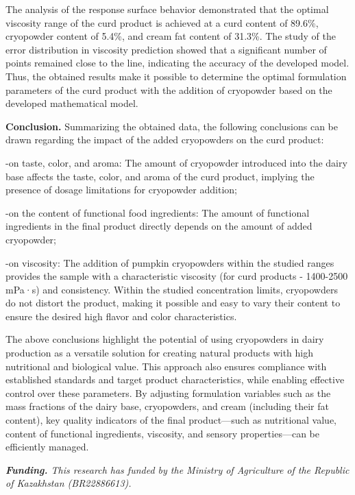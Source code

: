 \begin{multicols}{2}
The analysis of the response surface behavior demonstrated that the
optimal viscosity range of the curd product is achieved at a curd
content of 89.6\%, cryopowder content of 5.4\%, and cream fat content of
31.3\%. The study of the error distribution in viscosity prediction
showed that a significant number of points remained close to the line,
indicating the accuracy of the developed model. Thus, the obtained
results make it possible to determine the optimal formulation parameters
of the curd product with the addition of cryopowder based on the
developed mathematical model.

{\bfseries Conclusion.} Summarizing the obtained data, the following
conclusions can be drawn regarding the impact of the added cryopowders
on the curd product:

-on taste, color, and aroma: The amount of cryopowder introduced into
the dairy base affects the taste, color, and aroma of the curd product,
implying the presence of dosage limitations for cryopowder addition;

-on the content of functional food ingredients: The amount of functional
ingredients in the final product directly depends on the amount of added
cryopowder;

-on viscosity: The addition of pumpkin cryopowders within the studied
ranges provides the sample with a characteristic viscosity (for curd
products - 1400-2500 mPa·s) and consistency. Within the studied
concentration limits, cryopowders do not distort the product, making it
possible and easy to vary their content to ensure the desired high
flavor and color characteristics.

The above conclusions highlight the potential of using cryopowders in
dairy production as a versatile solution for creating natural products
with high nutritional and biological value. This approach also ensures
compliance with established standards and target product
characteristics, while enabling effective control over these parameters.
By adjusting formulation variables such as the mass fractions of the
dairy base, cryopowders, and cream (including their fat content), key
quality indicators of the final product---such as nutritional value,
content of functional ingredients, viscosity, and sensory
properties---can be efficiently managed.

\emph{{\bfseries Funding.} This research has funded by the Ministry of
Agriculture of the Republic of Kazakhstan (BR22886613).}
\end{multicols}

